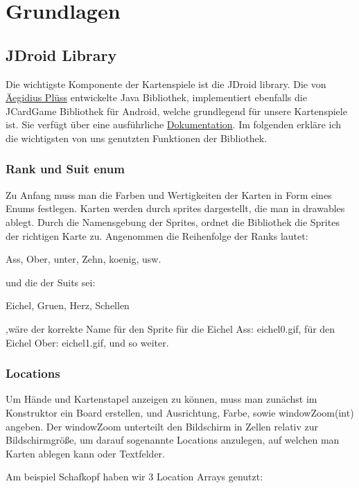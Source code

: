 \chapter{Grundlagen}

\section{JDroid Library}
\sectionauthor{\philipp}

Die wichtigste Komponente der Kartenspiele ist die JDroid library. Die von
\href{http://www.aplu.ch/home/apluhomex.jsp?site=99}{Äegidius Plüss} entwickelte
Java Bibliothek, implementiert ebenfalls die JCardGame Bibliothek für Android,
welche grundlegend für unsere Kartenspiele ist. Sie verfügt über eine
ausführliche
\href{http://www.java-online.ch/gamegrid/index.php?inhalt_links=navigation.inc.php&inhalt_mitte=iframedoc1.html}{Dokumentation}.
Im folgenden erkläre ich die wichtigsten von uns genutzten Funktionen der
Bibliothek.

\subsection{Rank und Suit enum}

Zu Anfang muss man die Farben und Wertigkeiten der Karten in Form eines Enums
festlegen. Karten werden durch sprites dargestellt, die man in drawables ablegt. Durch die
Namensgebung der Sprites, ordnet die Bibliothek die Sprites der richtigen Karte
zu. 
Angenommen die Reihenfolge der Ranks lautet:

Ass, Ober, unter, Zehn, koenig, usw.

und die der Suits sei:

Eichel, Gruen, Herz, Schellen

,wäre der korrekte Name für den Sprite für die Eichel Ass: eichel0.gif, für den Eichel Ober: eichel1.gif, und so weiter.
\subsection{Locations}

Um Hände und Kartenstapel anzeigen zu können, muss man zunächst im Konstruktor
ein Board erstellen, und Ausrichtung, Farbe, sowie windowZoom(int) angeben. Der
windowZoom unterteilt den Bildschirm in Zellen relativ zur Bildschirmgröße, um
darauf sogenannte Locations anzulegen, auf welchen man Karten ablegen kann oder
Textfelder.

Am beispiel Schafkopf haben wir 3 Location Arrays genutzt:

